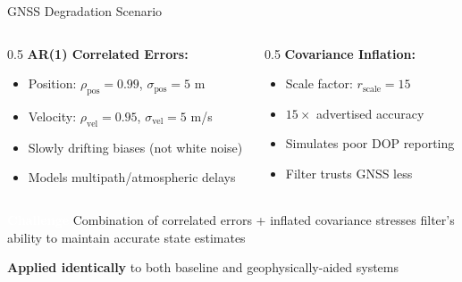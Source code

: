 \documentclass[aspectratio=169]{beamer}
\begin{document}
\begin{frame}{GNSS Degradation Scenario}
\begin{columns}[t]
\begin{column}{0.5\textwidth}
\textbf{AR(1) Correlated Errors:}
\begin{itemize}
    \item Position: $\rho_{\text{pos}} = 0.99$, $\sigma_{\text{pos}} = 5$ m
    \item Velocity: $\rho_{\text{vel}} = 0.95$, $\sigma_{\text{vel}} = 5$ m/s
    \item Slowly drifting biases (not white noise)
    \item Models multipath/atmospheric delays
\end{itemize}
\pause
\end{column}
\begin{column}{0.5\textwidth}
    \textbf{Covariance Inflation:}
    \begin{itemize}
        \item Scale factor: $r_{\text{scale}} = 15$
        \item $15\times$ advertised accuracy
        \item Simulates poor DOP reporting
        \item Filter trusts GNSS less
    \end{itemize}
    \pause
\end{column}
\end{columns}
\vspace{.25cm}
\begin{alertblock}{\textbf{\textcolor{white}{Challenge}}}
Combination of correlated errors + inflated covariance stresses filter's ability to maintain accurate state estimates
\end{alertblock}

\vspace{0.5em}
\textbf{Applied identically} to both baseline and geophysically-aided systems

\end{frame}
\end{document}

